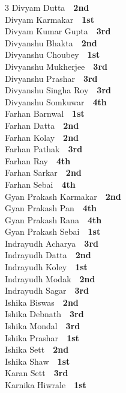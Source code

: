 \documentclass[11pt,a4paper]{article}
\begin{document}
\begin{multicols}{3}
Divyam Dutta~\dotfill~\textbf{2nd}\\
Divyam Karmakar~\dotfill~\textbf{1st}\\
Divyam Kumar Gupta~\dotfill~\textbf{3rd}\\
Divyanshu Bhakta~\dotfill~\textbf{2nd}\\
Divyanshu Choubey~\dotfill~\textbf{1st}\\
Divyanshu Mukherjee~\dotfill~\textbf{3rd}\\
Divyanshu Prashar~\dotfill~\textbf{3rd}\\
Divyanshu Singha Roy~\dotfill~\textbf{3rd}\\
Divyanshu Somkuwar~\dotfill~\textbf{4th}\\
Farhan Barnwal~\dotfill~\textbf{1st}\\
Farhan Datta~\dotfill~\textbf{2nd}\\
Farhan Kolay~\dotfill~\textbf{2nd}\\
Farhan Pathak~\dotfill~\textbf{3rd}\\
Farhan Ray~\dotfill~\textbf{4th}\\
Farhan Sarkar~\dotfill~\textbf{2nd}\\
Farhan Sebai~\dotfill~\textbf{4th}\\
Gyan Prakash Karmakar~\dotfill~\textbf{2nd}\\
Gyan Prakash Pan~\dotfill~\textbf{4th}\\
Gyan Prakash Rana~\dotfill~\textbf{4th}\\
Gyan Prakash Sebai~\dotfill~\textbf{1st}\\
Indrayudh Acharya~\dotfill~\textbf{3rd}\\
Indrayudh Datta~\dotfill~\textbf{2nd}\\
Indrayudh Koley~\dotfill~\textbf{1st}\\
Indrayudh Modak~\dotfill~\textbf{2nd}\\
Indrayudh Sagar~\dotfill~\textbf{3rd}\\
Ishika Biswas~\dotfill~\textbf{2nd}\\
Ishika Debnath~\dotfill~\textbf{3rd}\\
Ishika Mondal~\dotfill~\textbf{3rd}\\
Ishika Prashar~\dotfill~\textbf{1st}\\
Ishika Sett~\dotfill~\textbf{2nd}\\
Ishika Shaw~\dotfill~\textbf{1st}\\
Karan Sett~\dotfill~\textbf{3rd}\\
Karnika Hiwrale~\dotfill~\textbf{1st}\\

\end{multicols}
\end{document}
